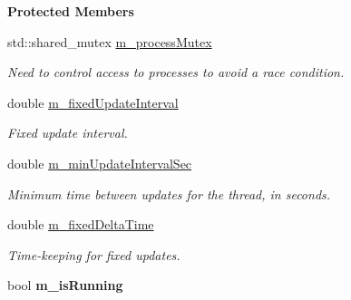 \begin{Indent}\textbf{ Protected Members}\par
\begin{DoxyCompactItemize}
\item 
\mbox{\label{classrev_1_1_process_thread_a2efb807785edec85b75f478f0dc8d140}} 
std\+::shared\+\_\+mutex \mbox{\hyperlink{classrev_1_1_process_thread_a2efb807785edec85b75f478f0dc8d140}{m\+\_\+process\+Mutex}}
\begin{DoxyCompactList}\small\item\em Need to control access to processes to avoid a race condition. \end{DoxyCompactList}\item 
double \mbox{\hyperlink{classrev_1_1_process_thread_a618db433e80f313fadea67ca7ffffffc}{m\+\_\+fixed\+Update\+Interval}}
\begin{DoxyCompactList}\small\item\em Fixed update interval. \end{DoxyCompactList}\item 
\mbox{\label{classrev_1_1_process_thread_a09e5404833144772b8272a5fce75797a}} 
double \mbox{\hyperlink{classrev_1_1_process_thread_a09e5404833144772b8272a5fce75797a}{m\+\_\+min\+Update\+Interval\+Sec}}
\begin{DoxyCompactList}\small\item\em Minimum time between updates for the thread, in seconds. \end{DoxyCompactList}\item 
\mbox{\label{classrev_1_1_process_thread_ac27abf5d26e1720633a50966e44d85a2}} 
double \mbox{\hyperlink{classrev_1_1_process_thread_ac27abf5d26e1720633a50966e44d85a2}{m\+\_\+fixed\+Delta\+Time}}
\begin{DoxyCompactList}\small\item\em Time-\/keeping for fixed updates. \end{DoxyCompactList}\item 
\mbox{\label{classrev_1_1_process_thread_aeebc0fee5637ecc724acf6b312e34506}} 
bool {\bfseries m\+\_\+is\+Running}
\item 
\mbox{\label{classrev_1_1_process_thread_a6972c0eb34f36a442f089d067cc80f56}} 

\end{DoxyCompactItemize}
\end{Indent}
